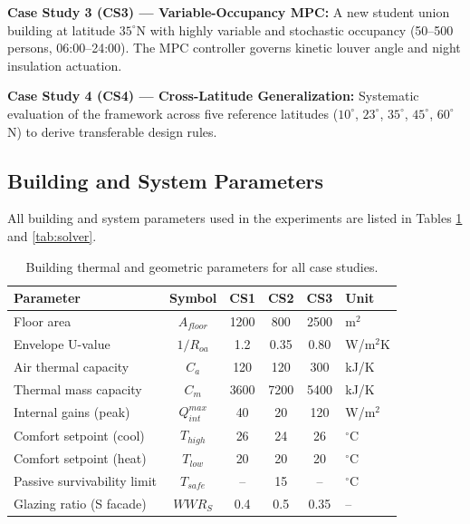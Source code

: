 \documentclass[5p,times,twocolumn]{elsarticle}
\begin{document}
\textbf{Case Study 3 (CS3) --- Variable-Occupancy MPC:} A new student union building at latitude $35^\circ$N with highly variable and stochastic occupancy (50--500 persons, 06:00--24:00). The MPC controller governs kinetic louver angle and night insulation actuation.

\textbf{Case Study 4 (CS4) --- Cross-Latitude Generalization:} Systematic evaluation of the framework across five reference latitudes ($10^\circ$, $23^\circ$, $35^\circ$, $45^\circ$, $60^\circ$N) to derive transferable design rules.

\subsection{Building and System Parameters}

All building and system parameters used in the experiments are listed in Tables \ref{tab:building} and \ref{tab:solver}.

\begin{table}[!t]
\centering
\small
\caption{Building thermal and geometric parameters for all case studies.}
\label{tab:building}
\begin{tabularx}{\textwidth}{@{} >{\raggedright\arraybackslash}X c c c c l @{}}
\toprule
\textbf{Parameter} & \textbf{Symbol} & \textbf{CS1} & \textbf{CS2} & \textbf{CS3} & \textbf{Unit} \\
\midrule
Floor area & $A_{floor}$ & 1200 & 800 & 2500 & m$^2$ \\
Envelope U-value & $1/R_{oa}$ & 1.2 & 0.35 & 0.80 & W/m$^2$K \\
Air thermal capacity & $C_a$ & 120 & 120 & 300 & kJ/K \\
Thermal mass capacity & $C_m$ & 3600 & 7200 & 5400 & kJ/K \\
Internal gains (peak) & $Q_{int}^{max}$ & 40 & 20 & 120 & W/m$^2$ \\
Comfort setpoint (cool) & $T_{high}$ & 26 & 24 & 26 & $^\circ$C \\
Comfort setpoint (heat) & $T_{low}$ & 20 & 20 & 20 & $^\circ$C \\
Passive survivability limit & $T_{safe}$ & -- & 15 & -- & $^\circ$C \\
Glazing ratio (S facade) & $WWR_S$ & 0.4 & 0.5 & 0.35 & -- \\
\bottomrule
\end{tabularx}
\end{table}
\end{document}
